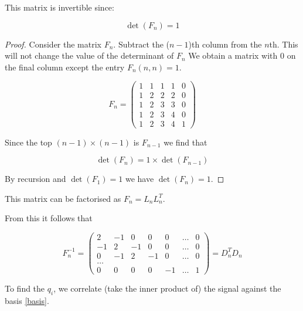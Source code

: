 \begin{theorem}
This matrix is invertible since:

\begin{equation}
\det(F_n) = 1
\end{equation}
\end{theorem}
\begin{proof}
Consider the matrix \(F_n\). Subtract the (\(n-1\))th column from the \(n\)th. This will not change the value of the determinant of \(F_n\) We obtain a matrix with \(0\) on the final column except the entry \(F_n(n,n) = 1\). 


\begin{equation}
F_n= \begin{pmatrix}
 1 & 1 & 1 & 1  & 0 \\
  1 & 2 & 2 & 2  & 0\\
     1 & 2 & 3 & 3  & 0  \\
    1 & 2 & 3 & 4  & 0 \\
     1 & 2 & 3 & 4  & 1 
\end{pmatrix}
\end{equation}

Since the top \((n-1) \times (n-1)\) is \(F_{n-1}\) we find that 

\begin{equation}
\det(F_n) = 1 \times \det(F_{n-1})
\end{equation} 

By recursion and \(\det(F_1) = 1\) we have \(\det(F_n) = 1\).

\end{proof}

This matrix can be factorised as \(F_n = L_nL_n^T\).

From this it follows that

\begin{equation}
F_n^{-1} = \begin{pmatrix}
 2 & -1 & 0 & 0  & 0 &\ldots & 0 \\
  -1 & 2 & -1 & 0  & 0  &\ldots & 0\\
     0 & -1 & 2 & -1  & 0  &\ldots & 0  \\
    \ldots  \\
     0 & 0 & 0 & 0 &-1 & \ldots & 1 
\end{pmatrix} = D_n^TD_n
\end{equation}

To find the \(q_i\), we correlate (take the inner product of) the signal against the basis \eqref{basis}.

